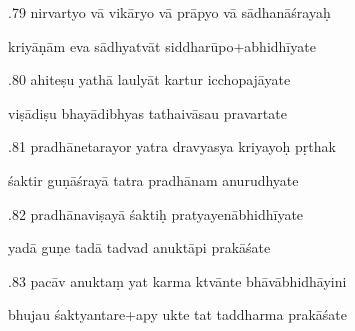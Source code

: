 \documentclass[article,12pt,a4paper]{memoir}%
\newcounter{parCount}
\begin{document}
	  
	  \pstart {}.79 nirvartyo vā vikāryo vā prāpyo vā sādhanāśrayaḥ 
	{}
	\pend%
      

	  
	  \pstart \leavevmode%
	kriyāṇām eva sādhyatvāt siddharūpo+abhidhīyate 
	{}
	\pend%
      

	  
	  \pstart {}.80 ahiteṣu yathā laulyāt kartur icchopajāyate 
	{}
	\pend%
      

	  
	  \pstart \leavevmode%
	viṣādiṣu bhayādibhyas tathaivāsau pravartate 
	{}
	\pend%
      

	  
	  \pstart {}.81 pradhānetarayor yatra dravyasya kriyayoḥ pṛthak 
	{}
	\pend%
      

	  
	  \pstart \leavevmode%
	śaktir guṇāśrayā tatra pradhānam anurudhyate 
	{}
	\pend%
      

	  
	  \pstart {}.82 pradhānaviṣayā śaktiḥ pratyayenābhidhīyate 
	{}
	\pend%
      

	  
	  \pstart \leavevmode%
	yadā guṇe tadā tadvad anuktāpi prakāśate 
	{}
	\pend%
      

	  
	  \pstart {}.83 pacāv anuktaṃ yat karma ktvānte bhāvābhidhāyini 
	{}
	\pend%
      

	  
	  \pstart \leavevmode%
	bhujau śaktyantare+apy ukte tat taddharma prakāśate 
	{}
	\pend%
      
\end{document}
